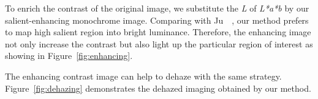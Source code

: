 To enrich the contrast of the original image, we substitute the {\it L} of {\it L*a*b}
by our salient-enhancing monochrome image. Comparing with Ju~\etal~\cite{Lu:2012:CPD},
our method prefers to map high salient region into bright luminance. 
Therefore, the enhancing image not only increase the contrast but also 
light up the particular region of interest as showing in Figure~\ref{fig:enhancing}.

The enhancing contrast image can help to dehaze with the same strategy. 
Figure~\ref{fig:dehazing} demonstrates the dehazed imaging obtained by our method.

